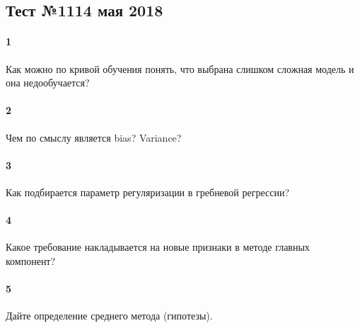 \documentclass[a4paper,12pt]{article}
\begin{document}
  \subsection*{Тест №11\hfill{14 мая 2018}}

  
  \paragraph{1} Как можно по кривой обучения понять, что выбрана слишком сложная модель и она недообучается?

  \makebox[\linewidth]{\hrulefill}
  \makebox[\linewidth]{\hrulefill}

  \paragraph{2} Чем по смыслу является bias? Variance?
	
  \makebox[\linewidth]{\hrulefill}
  \makebox[\linewidth]{\hrulefill}
  \makebox[\linewidth]{\hrulefill}
	
  \paragraph{3} Как подбирается параметр регуляризации в гребневой регрессии?

  \makebox[\linewidth]{\hrulefill}
  \makebox[\linewidth]{\hrulefill}
  \makebox[\linewidth]{\hrulefill}
  \makebox[\linewidth]{\hrulefill}

  \paragraph{4} Какое требование накладывается на новые признаки в методе главных компонент?

  \makebox[\linewidth]{\hrulefill}
  \makebox[\linewidth]{\hrulefill}
  \makebox[\linewidth]{\hrulefill}
  \makebox[\linewidth]{\hrulefill}

  \paragraph{5} Дайте определение среднего метода (гипотезы).

  \makebox[\linewidth]{\hrulefill}
  \makebox[\linewidth]{\hrulefill}
  \makebox[\linewidth]{\hrulefill}
  \makebox[\linewidth]{\hrulefill}
  \makebox[\linewidth]{\hrulefill}
 
\end{document}
